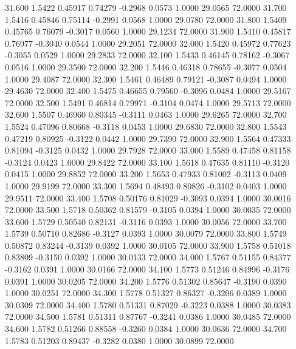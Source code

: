   31.600   1.5422   0.45917   0.74279  -0.2968   0.0573   1.0000  29.0565  72.0000
  31.700   1.5416   0.45846   0.75114  -0.2991   0.0568   1.0000  29.0780  72.0000
  31.800   1.5409   0.45765   0.76079  -0.3017   0.0560   1.0000  29.1234  72.0000
  31.900   1.5410   0.45817   0.76977  -0.3040   0.0544   1.0000  29.2051  72.0000
  32.000   1.5420   0.45972   0.77623  -0.3055   0.0529   1.0000  29.2833  72.0000
  32.100   1.5433   0.46145   0.78162  -0.3067   0.0516   1.0000  29.3500  72.0000
  32.200   1.5446   0.46318   0.78655  -0.3077   0.0504   1.0000  29.4087  72.0000
  32.300   1.5461   0.46489   0.79121  -0.3087   0.0494   1.0000  29.4630  72.0000
  32.400   1.5475   0.46655   0.79560  -0.3096   0.0484   1.0000  29.5167  72.0000
  32.500   1.5491   0.46814   0.79971  -0.3104   0.0474   1.0000  29.5713  72.0000
  32.600   1.5507   0.46960   0.80345  -0.3111   0.0463   1.0000  29.6265  72.0000
  32.700   1.5524   0.47096   0.80668  -0.3118   0.0453   1.0000  29.6830  72.0000
  32.800   1.5543   0.47219   0.80925  -0.3122   0.0442   1.0000  29.7390  72.0000
  32.900   1.5564   0.47333   0.81094  -0.3125   0.0432   1.0000  29.7928  72.0000
  33.000   1.5589   0.47458   0.81158  -0.3124   0.0423   1.0000  29.8422  72.0000
  33.100   1.5618   0.47635   0.81110  -0.3120   0.0415   1.0000  29.8852  72.0000
  33.200   1.5653   0.47933   0.81002  -0.3113   0.0409   1.0000  29.9199  72.0000
  33.300   1.5694   0.48493   0.80826  -0.3102   0.0403   1.0000  29.9511  72.0000
  33.400   1.5708   0.50176   0.81029  -0.3093   0.0394   1.0000  30.0016  72.0000
  33.500   1.5718   0.50362   0.81579  -0.3105   0.0394   1.0000  30.0035  72.0000
  33.600   1.5729   0.50540   0.82131  -0.3116   0.0393   1.0000  30.0056  72.0000
  33.700   1.5739   0.50710   0.82686  -0.3127   0.0393   1.0000  30.0079  72.0000
  33.800   1.5749   0.50872   0.83244  -0.3139   0.0392   1.0000  30.0105  72.0000
  33.900   1.5758   0.51018   0.83809  -0.3150   0.0392   1.0000  30.0133  72.0000
  34.000   1.5767   0.51155   0.84377  -0.3162   0.0391   1.0000  30.0166  72.0000
  34.100   1.5773   0.51246   0.84996  -0.3176   0.0391   1.0000  30.0205  72.0000
  34.200   1.5776   0.51302   0.85647  -0.3190   0.0390   1.0000  30.0251  72.0000
  34.300   1.5778   0.51327   0.86327  -0.3206   0.0389   1.0000  30.0309  72.0000
  34.400   1.5780   0.51331   0.87029  -0.3223   0.0388   1.0000  30.0383  72.0000
  34.500   1.5781   0.51311   0.87767  -0.3241   0.0386   1.0000  30.0485  72.0000
  34.600   1.5782   0.51266   0.88558  -0.3260   0.0384   1.0000  30.0636  72.0000
  34.700   1.5783   0.51203   0.89437  -0.3282   0.0380   1.0000  30.0899  72.0000
